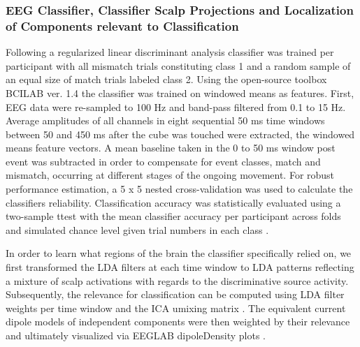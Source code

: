 \subsubsection{EEG Classifier, Classifier Scalp Projections and Localization of Components relevant to Classification}
Following \citet{Zander2016} a regularized linear discriminant analysis classifier was trained per participant with all mismatch trials constituting class 1 and a random sample of an equal size of match trials labeled class 2. Using the open-source toolbox BCILAB ver. 1.4 the classifier was trained on windowed means as features. First, EEG data were re-sampled to 100 Hz and band-pass filtered from 0.1 to 15 Hz. Average amplitudes of all channels in eight sequential 50 ms time windows between 50 and 450 ms after the cube was touched were extracted, the windowed means feature vectors. A mean baseline taken in the 0 to 50 ms window post event was subtracted in order to compensate for event classes, match and mismatch, occurring at different stages of the ongoing movement. For robust performance estimation, a 5 x 5 nested cross-validation was used to calculate the classifiers reliability. Classification accuracy was statistically evaluated using a two-sample ttest with the mean classifier accuracy per participant across folds and simulated chance level given trial numbers in each class \cite{Muller-Putz2007}.

In order to learn what regions of the brain the classifier specifically relied on, we first transformed the LDA filters at each time window to LDA patterns reflecting a mixture of scalp activations with regards to the discriminative source activity. Subsequently, the relevance for classification can be computed using LDA filter weights per time window and the ICA umixing matrix \cites{Haufe2014a, Zander2016}. The equivalent current dipole models of independent components were then weighted by their relevance and ultimately visualized via EEGLAB dipoleDensity plots \cite{Krol2019}. 

